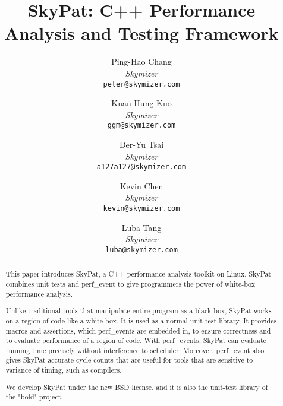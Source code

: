 \documentclass[final]{ols}
\begin{document}
\title{SkyPat: C++ Performance Analysis and Testing Framework}
\subtitle{}

\author{
	Ping-Hao Chang \\
	{\em Skymizer}\\
	{\tt\small peter@skymizer.com}\\
\and
	Kuan-Hung Kuo\\
	{\em Skymizer}\\
	{\tt\small ggm@skymizer.com}\\
\and
	Der-Yu Tsai\\
	{\em Skymizer}\\
	{\tt\small a127a127@skymizer.com}\\
\and
	Kevin Chen\\
	{\em Skymizer}\\
	{\tt\small kevin@skymizer.com}
\and
	Luba Tang\\
	{\em Skymizer}\\
	{\tt\small luba@skymizer.com}\\
}

\date{} %

\maketitle


\begin{abstract}
This paper introduces SkyPat, a C++ performance analysis toolkit on Linux.
SkyPat combines unit tests and perf\_event to give programmers the power of white-box performance analysis.

Unlike traditional tools that manipulate entire program as a black-box, SkyPat works on a region of code like a white-box.
It is used as a normal unit test library.
It provides macros and assertions, which perf\_events are embedded in, to ensure correctness and to evaluate performance of a region of code.
With perf\_events, SkyPat can evaluate running time precisely without interference to scheduler.
Moreover, perf\_event also gives SkyPat accurate cycle counts that are useful for tools that are sensitive to variance of timing, such as compilers.

We develop SkyPat under the new BSD license, and it is also the unit-test library of the "bold" project.
\end{abstract}
\end{document}

